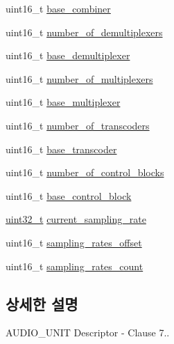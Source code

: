 \begin{DoxyCompactItemize}
\item 
uint16\+\_\+t \hyperlink{structjdksavdecc__descriptor__audio__unit_afeae9980c36b3e99f2e4b8ab2c31e9d5}{base\+\_\+combiner}
\item 
uint16\+\_\+t \hyperlink{structjdksavdecc__descriptor__audio__unit_ae2ee0d16f100be7e14722eaffcc600b4}{number\+\_\+of\+\_\+demultiplexers}
\item 
uint16\+\_\+t \hyperlink{structjdksavdecc__descriptor__audio__unit_a36901b5833f03ae7be92b52745b3054c}{base\+\_\+demultiplexer}
\item 
uint16\+\_\+t \hyperlink{structjdksavdecc__descriptor__audio__unit_aa2bffcf80dd2b162cce9a335ef515165}{number\+\_\+of\+\_\+multiplexers}
\item 
uint16\+\_\+t \hyperlink{structjdksavdecc__descriptor__audio__unit_a3e13f295f26afe3335587c18790c7dda}{base\+\_\+multiplexer}
\item 
uint16\+\_\+t \hyperlink{structjdksavdecc__descriptor__audio__unit_ad9030c572f8891febbc6108f96772835}{number\+\_\+of\+\_\+transcoders}
\item 
uint16\+\_\+t \hyperlink{structjdksavdecc__descriptor__audio__unit_ac7e02a98f43dc72d6384a6635fbaf944}{base\+\_\+transcoder}
\item 
uint16\+\_\+t \hyperlink{structjdksavdecc__descriptor__audio__unit_a564f961a8cec6e8f7b4bfdbbbfe650d4}{number\+\_\+of\+\_\+control\+\_\+blocks}
\item 
uint16\+\_\+t \hyperlink{structjdksavdecc__descriptor__audio__unit_a9303491ec92ba42c28fb904c14d310b0}{base\+\_\+control\+\_\+block}
\item 
\hyperlink{parse_8c_a6eb1e68cc391dd753bc8ce896dbb8315}{uint32\+\_\+t} \hyperlink{structjdksavdecc__descriptor__audio__unit_a081e14c5c832a659daf22003ed8e918d}{current\+\_\+sampling\+\_\+rate}
\item 
uint16\+\_\+t \hyperlink{structjdksavdecc__descriptor__audio__unit_a9acd91129819909097f834e4592e8779}{sampling\+\_\+rates\+\_\+offset}
\item 
uint16\+\_\+t \hyperlink{structjdksavdecc__descriptor__audio__unit_a9e41095f67119ce7ad3da11e7a7fa520}{sampling\+\_\+rates\+\_\+count}
\end{DoxyCompactItemize}


\subsection{상세한 설명}
A\+U\+D\+I\+O\+\_\+\+U\+N\+IT Descriptor -\/ Clause 7.. 

